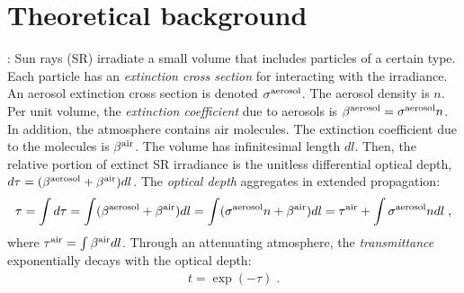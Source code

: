 \documentclass[10pt,letterpaper]{article}
\begin{document}
\section{Theoretical background}
\label{sec:theor-backgr}

: Sun rays (SR) irradiate a small volume
that includes particles of a certain type.  Each particle has an {\em
  extinction cross section} for interacting with the irradiance. An
aerosol extinction cross section is denoted $\sigma^{\rm aerosol}$.
The aerosol density is $n$. Per unit volume, the {\em extinction
  coefficient} due to aerosols is $\beta^{\rm aerosol}= \sigma^{\rm
  aerosol} n$. In addition, the atmosphere contains air molecules.
The extinction coefficient due to the molecules is $\beta^{\rm air}$.
The volume has infinitesimal length $dl$. Then, the relative portion
of extinct SR irradiance is the unitless differential optical depth,
$d\tau= (\beta^{\rm aerosol}+\beta^{\rm air}) dl$.  The {\em optical
  depth} aggregates in extended propagation:
\begin{align}
  \tau= \int d\tau=\int (\beta^{\rm aerosol}+\beta^{\rm air}) dl =\int
  (\sigma^{\rm aerosol} n +\beta^{\rm air}) dl = \tau^{\rm air}+ \int
  \sigma^{\rm aerosol} n dl \;,
  \label{eq:tau}
\end{align}
where $\tau^{\rm air}=\int \beta^{\rm air} dl$.  Through an
attenuating atmosphere, the {\em transmittance} exponentially decays
with the optical depth:
\begin{align}
  t=\exp(-\tau) \;.
  \label{eq:beer-lambert}
\end{align}
\end{document}
